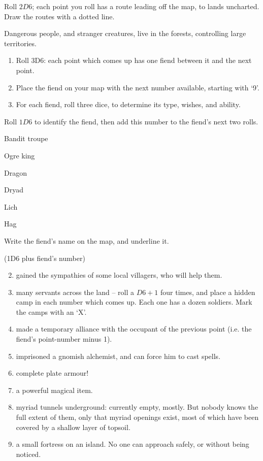 \begin{multicols}{2}

Roll $2D6$; each point you roll has a route leading off the map, to lands uncharted.
Draw the routes with a dotted line.


Dangerous people, and stranger creatures, live in the forests, controlling large territories.

\begin{enumerate}
\item
  Roll 3D6: each point which comes up has one fiend between it and the
  next point.
\item
  Place the fiend on your map with the next number available, starting with `9'.
\item
  For each fiend, roll three dice, to determine its type, wishes, and
  ability.
\end{enumerate}


Roll $1D6$ to identify the fiend, then add this number to the fiend's next two rolls.

\begin{multicols}{2}
\begin{dlist}
\item
  Bandit troupe
\item
  Ogre king
\item
  Dragon
\item
  Dryad
\item
  Lich
\item
  Hag
\end{dlist}
\end{multicols}

Write the fiend's name on the map, and underline it.


(1D6 plus fiend's number)

\begin{enumerate}
\setcounter{enumi}{1}
\item
  gained the sympathies of some local villagers, who will help them.
\item
  many servants across the land -- roll a $D6 + 1$ four times, and place a hidden camp in each number which comes up.
  Each one has a dozen soldiers.
  Mark the camps with an `X'.
\item
  made a temporary alliance with the occupant of the previous point (i.e. the fiend's point-number minus 1).
\item
  imprisoned a gnomish alchemist, and can force him to cast spells.
\item
  complete plate armour!
\item
  a powerful magical item.
\item
  myriad tunnels underground: currently empty, mostly. But nobody knows
  the full extent of them, only that myriad openings exist, most of
  which have been covered by a shallow layer of topsoil.
\item
  a small fortress on an island. No one can approach safely, or without
  being noticed.


\end{enumerate}
\end{multicols}
